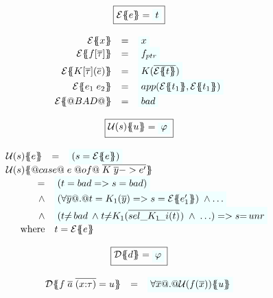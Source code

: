 \begin{figure}\small
\setlength{\arraycolsep}{2pt} 
\[\begin{array}{c} 
\ruleform{\etrans{\Sigma}{\Gamma}{e} = \formula{t} } \\ \\
\begin{array}{rcl}
\etrans{\Sigma}{\Gamma}{x} & = & \formula{x} \\
\etrans{\Sigma}{\Gamma}{f[\ol{\tau}]} & = & \formula{f_{ptr}} \\
\etrans{\Sigma}{\Gamma}{K[\ol{\tau}](\ol{e})} & = & \formula{K(\ol{\etrans{e}{\Gamma}{t}})} \\
\etrans{\Sigma}{\Gamma}{e_1\;e_2} & = & \formula{app(\etrans{\Sigma}{\Gamma}{t_1},
                                                     \etrans{\Sigma}{\Gamma}{t_1})} \\
\etrans{\Sigma}{\Gamma}{@BAD@} & = & \formula{\bad}
\end{array}
\\ \\
\ruleform{\utrans{\Sigma}{u}{s} = \formula{\phi}} \\ \\
\begin{array}{rcl}
\utrans{\Sigma}{e}{s}
  & = & \formula{(s = \etrans{\Sigma}{\Gamma}{e})} \\
\multicolumn{3}{l}{\utrans{\Sigma}
    {@case@\;e\;@of@\;\ol{K\;\ol{y} -> e'}}{s}} \\
\multicolumn{3}{l}{
\quad 
  \begin{array}[t]{rl}
    = & \formula{(t = \bad => s = bad)} \\ 
    \land & \formula{(\forall \ol{y} @.@ t = K_1(\ol{y}) => s = \etrans{\Sigma}{\Gamma}{e'_1})\;\land \ldots}  \\
    \land & \formula{(t{\neq}\bad\;\land\;
                 t{\neq}K_1(\oln{{\sel{K_1}{i}}(t)}{})\;\land\;\ldots) => s{=}\unr} \\
    \mbox{where} & t  =  \etrans{\Sigma}{\Gamma}{e} 
 \end{array}
}
\end{array}
\\ \\
\ruleform{\dtrans{\Sigma}{d} = \formula{\phi}} \\ \\
\begin{array}{rcl}
  \dtrans{\Sigma}{f \;\ol{a}\;\ol{(x{:}\tau)} = u} 
    & =     & \formula{\forall \ol{x} @.@ \utrans{\sigma}{u}{f(\ol{x})}} \\

\end{array}
\end{array}\]
\end{figure}
